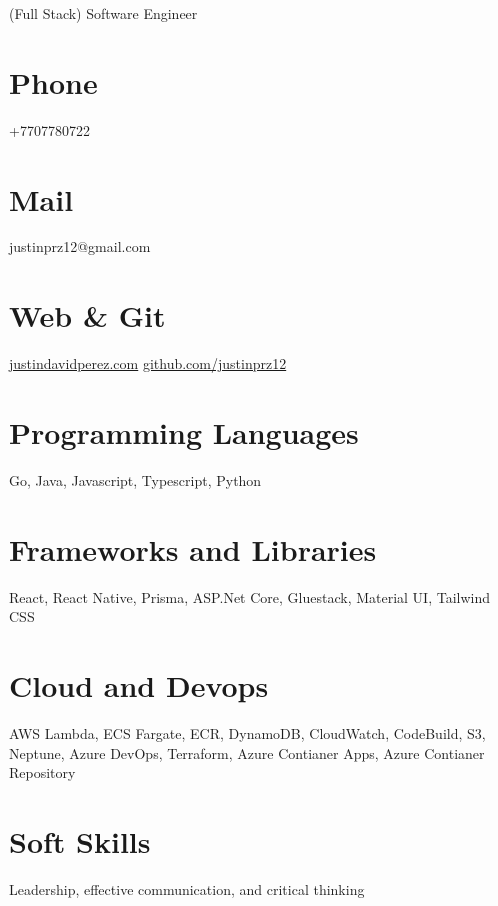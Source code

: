 \documentclass[]{friggeri-cv}
\begin{document}
      {(Full Stack) Software Engineer}
      

\begin{aside}
  \section{Phone}
    +7707780722
    ~
  \section{Mail}
    justinprz12@gmail.com
    ~
  \section{Web \& Git}
    \href{http://www.justindavidperez.com}{justindavidperez.com}
    \href{https://github.com/JustinPerez12}{github.com/justinprz12}
  \section{Programming Languages}
    Go, Java, Javascript, Typescript, Python
  \section{Frameworks and Libraries}
  React, React Native, Prisma, ASP.Net Core, Gluestack, Material UI, Tailwind CSS
  \section{Cloud and Devops}
    AWS Lambda, ECS Fargate, ECR, DynamoDB, CloudWatch, CodeBuild, S3, Neptune, Azure DevOps, Terraform, Azure Contianer Apps, Azure Contianer Repository
  \section{Soft Skills}
    Leadership, effective communication, and critical thinking
\end{aside}
\end{document}

